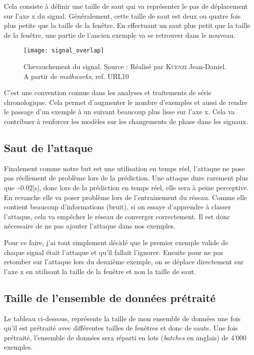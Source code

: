 Cela consiste à définir une taille de saut qui va représenter le pas de déplacement sur l'axe x du signal. Généralement, cette taille de saut est deux ou quatre fois plus petite que la taille de la fenêtre. En effectuant un saut plus petit que la taille de la fenêtre, une partie de l'ancien exemple va se retrouver dans le nouveau.

\begin{figure}[H]
	\centering
	\texttt{[image: signal\_overlap]}
	\caption[Chevauchement du signal]{Chevauchement du signal. Source : Réalisé par \textsc{Küenzi} Jean-Daniel. A partir de \textit{mathworks}, ref. URL10}
	\label{fig:signal_overlap}
\end{figure}

C'est une convention connue dans les analyses et traitements de série chronologique. Cela permet d'augmenter le nombre d'exemples et aussi de rendre le passage d'un exemple à un suivant beaucoup plus lisse sur l'axe x. Cela va contribuer à renforcer les modèles sur les changements de phase dans les signaux.

\subsection{Saut de l'attaque}

Finalement comme notre but est une utilisation en temps réel, l'attaque ne pose pas réellement de problème lors de la prédiction. Une attaque dure rarement plus que \textasciitilde0.02[s], donc lors de la prédiction en temps réel, elle sera à peine perceptive. En revanche elle va poser problème lors de l'entrainement du réseau. Comme elle contient beaucoup d'informations (bruit), si on essaye d'apprendre à classer l'attaque, cela va empêcher le réseau de converger correctement. Il est donc nécessaire de ne pas ajouter l'attaque dans nos exemples.

Pour ce faire, j'ai tout simplement décidé que le premier exemple valide de chaque signal était l'attaque et qu'il fallait l'ignorer. Ensuite pour ne pas retomber sur l'attaque lors du deuxième exemple, on se déplace directement sur l'axe x en utilisant la taille de la fenêtre et non la taille de saut.

\subsection{Taille de l'ensemble de données prétraité}

Le tableau ci-dessous, représente la taille de mon ensemble de données une fois qu'il est prétraité avec différentes tailles de fenêtres et donc de sauts. Une fois prétraité, l'ensemble de données sera réparti en lots (\textit{batches} en anglais) de 4'000 exemples.

